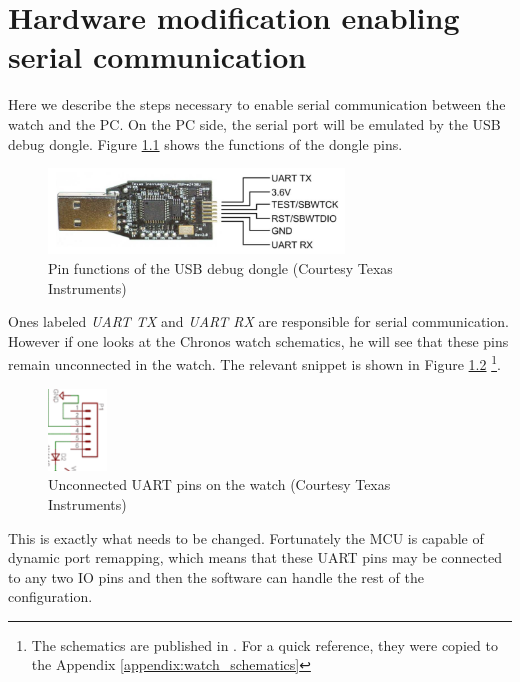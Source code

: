 \chapter{Hardware modification enabling serial communication}
\label{appendix:uart_pins}

Here we describe the steps necessary to enable serial communication
between the watch and the PC. On the PC side, the serial port will be
emulated by the USB debug dongle. Figure \ref{fig:chronos_dongle_pins}
shows the functions of the dongle pins.
\begin{figure}[h]
  \centering
  \includegraphics[width=0.7\textwidth]{img/chronos_dongle_pins.png}
  \caption{Pin functions of the USB debug dongle (Courtesy Texas Instruments)}
  \label{fig:chronos_dongle_pins}
\end{figure}
Ones labeled \emph{UART TX} and \emph{UART RX} are responsible for
serial communication. However if one looks at the Chronos watch schematics,
he will see that these pins remain unconnected in the watch. The relevant
snippet is shown in Figure \ref{fig:chronos_unonnected_uart}
\footnote{The schematics are published in \cite{eZ430Chronos}. For a quick
reference, they were copied to the Appendix
\ref{appendix:watch_schematics}}.
\begin{figure}[h]
  \centering
  \includegraphics[width=0.14\textwidth]{img/chronos_unonnected_uart.png}
  \caption{Unconnected UART pins on the watch (Courtesy Texas Instruments)}
  \label{fig:chronos_unonnected_uart}
\end{figure}
This is exactly what needs to be changed. Fortunately the MCU is
capable of dynamic port remapping, which means that these UART pins may
be connected to any two IO pins and then the software can handle the rest of the
configuration.


